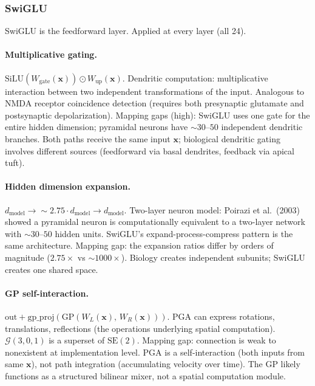 \documentclass[11pt,a4paper]{article}
\begin{document}
\subsubsection{SwiGLU}

SwiGLU is the feedforward layer. Applied at every layer (all 24).

\paragraph{Multiplicative gating.}
$\mathrm{SiLU}(W_{\mathrm{gate}}(\mathbf{x})) \odot W_{\mathrm{up}}(\mathbf{x})$. Dendritic computation: multiplicative interaction between two independent transformations of the input. Analogous to NMDA receptor coincidence detection (requires both presynaptic glutamate and postsynaptic depolarization). Mapping gaps (high): SwiGLU uses one gate for the entire hidden dimension; pyramidal neurons have ${\sim}30\text{--}50$ independent dendritic branches. Both paths receive the same input $\mathbf{x}$; biological dendritic gating involves different sources (feedforward via basal dendrites, feedback via apical tuft).

\paragraph{Hidden dimension expansion.}
$d_{\mathrm{model}} \to {\sim}2.75 \cdot d_{\mathrm{model}} \to d_{\mathrm{model}}$. Two-layer neuron model: Poirazi et al.\ (2003) showed a pyramidal neuron is computationally equivalent to a two-layer network with ${\sim}30\text{--}50$ hidden units. SwiGLU's expand-process-compress pattern is the same architecture. Mapping gap: the expansion ratios differ by orders of magnitude ($2.75\times$ vs ${\sim}1000\times$). Biology creates independent subunits; SwiGLU creates one shared space.

\paragraph{GP self-interaction.}
$\mathrm{out} + \mathrm{gp\_proj}(\mathrm{GP}(W_L(\mathbf{x}),\, W_R(\mathbf{x})))$. PGA can express rotations, translations, reflections (the operations underlying spatial computation). $\mathcal{G}(3,0,1)$ is a superset of $\mathrm{SE}(2)$. Mapping gap: connection is weak to nonexistent at implementation level. PGA is a self-interaction (both inputs from same $\mathbf{x}$), not path integration (accumulating velocity over time). The GP likely functions as a structured bilinear mixer, not a spatial computation module.
\end{document}
